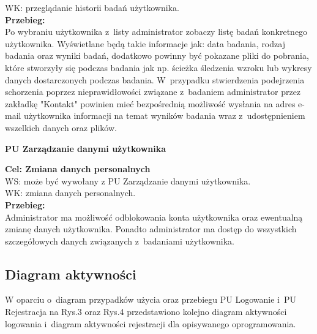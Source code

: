 \documentclass[12pt, letterpaper]{article}
\begin{document}
		WK: przeglądanie historii badań użytkownika. \\
		
		\textbf{Przebieg:}\\
		Po wybraniu użytkownika z~listy administrator zobaczy listę badań konkretnego użytkownika. Wyświetlane będą takie informacje jak: data badania, rodzaj badania oraz wyniki badań, dodatkowo powinny być pokazane pliki do pobrania, które stworzyły się podczas badania jak np. ścieżka śledzenia wzroku lub wykresy danych dostarczonych podczas badania. W~przypadku stwierdzenia podejrzenia schorzenia poprzez nieprawidłowości związane z~badaniem administrator przez zakładkę "Kontakt" powinien mieć bezpośrednią możliwość wysłania na adres e-mail użytkownika informacji na temat wyników badania wraz z~udostępnieniem wszelkich danych oraz plików.
		
		
		\newpage		
		
		\textbf{PU Zarządzanie danymi użytkownika}
		
		\quad
		
		\textbf{Cel: Zmiana danych personalnych}\\
		
		WS: może być wywołany z PU Zarządzanie danymi użytkownika.\\
		
		WK: zmiana danych personalnych.\\
		
		\textbf{Przebieg:}\\
		Administrator ma możliwość odblokowania konta użytkownika oraz ewentualną zmianę danych użytkownika. Ponadto administrator ma dostęp do wszystkich szczegółowych danych związanych z~badaniami użytkownika.
		 \\
		

		

		\subsection{Diagram aktywności}
		
		W oparciu o~diagram przypadków użycia oraz przebiegu PU Logowanie i~PU Rejestracja na Rys.3 oraz Rys.4 przedstawiono kolejno diagram aktywności logowania i~diagram aktywności rejestracji dla opisywanego oprogramowania.
		
\end{document}
